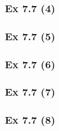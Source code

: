 \subsubsection{Ex 7.7 (4)}\label{sec:Ex_7.7.4}

\subsubsection{Ex 7.7 (5)}\label{sec:Ex_7.7.5}

\subsubsection{Ex 7.7 (6)}\label{sec:Ex_7.7.6}

\subsubsection{Ex 7.7 (7)}\label{sec:Ex_7.7.7}

\subsubsection{Ex 7.7 (8)}\label{sec:Ex_7.7.8}




